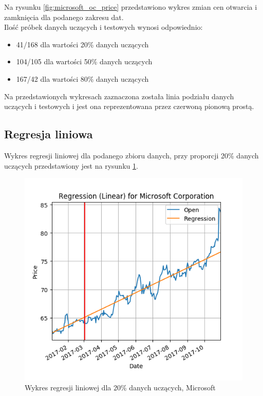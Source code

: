 Na rysunku \ref{fig:microsoft_oc_price} przedstawiono wykres zmian cen otwarcia i zamknięcia dla podanego zakresu dat.\\ 

Ilość próbek danych uczących i testowych wynosi odpowiednio:
\begin{itemize}
 \item 41/168 dla wartości 20\% danych uczących
 \item 104/105 dla wartości 50\% danych uczących
 \item 167/42 dla wartości 80\% danych uczących
\end{itemize}
Na przedstawionych wykresach zaznaczona została linia podziału danych uczących i testowych i jest ona reprezentowana przez czerwoną pionową prostą.

\subsection{Regresja liniowa}
Wykres regresji liniowej dla podanego zbioru danych, przy proporcji 20\% danych uczących przedstawiony jest na rysunku \ref{fig:microsoft_linear_20}.\\

\begin{figure}[ht]
\centering
\includegraphics[scale=0.4]{pictures/plots/microsoft_linear_20.png}
\caption{Wykres regresji liniowej dla 20\% danych uczących, Microsoft}
\label{fig:microsoft_linear_20}
\end{figure}

